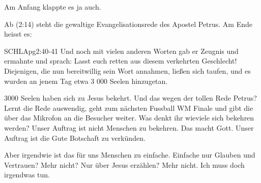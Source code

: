 \documentclass[14pt]{../../inc/mybib}
\newenvironment{block}[1][]{%
  \vspace{1.5em}%
  \noindent\textbf{#1}\par%
  \vspace{0.0em}%
}{%
  \vspace{1em}%
}
\begin{document}
    Am Anfang klappte es ja auch.
\begin{block}
    Ab (2:14) steht die gewaltige Evangelisationsrede des Apostel Petrus. Am Ende heisst es:
    \begin{bibelbox}{SCHL}{Apg}{2:40-41}
        Und noch mit vielen anderen Worten gab er Zeugnis und ermahnte und sprach: Lasst euch retten aus diesem verkehrten Geschlecht! Diejenigen, die nun bereitwillig sein Wort annahmen, ließen sich taufen, und es wurden an jenem Tag etwa 3 000 Seelen hinzugetan.
    \end{bibelbox} 
    3000 Seelen haben sich zu Jesus bekehrt. Und das wegen der tollen Rede Petrus? Lernt die Rede auswendig, geht zum nächsten Fussball WM Finale und gibt die über das Mikrofon an die Besucher weiter. Was denkt ihr wieviele sich bekehren werden? Unser Auftrag ist nicht Menschen zu bekehren. Das macht Gott. Unser Auftrag ist die Gute Botschaft zu verkünden.
\end{block}
\begin{block}
    Aber irgendwie ist das für uns Menschen zu einfache. Einfache nur Glauben und Vertrauen? Mehr nicht? Nur über Jesus erzählen? Mehr nicht. Ich muss doch irgendwas tun.
\end{block}
\end{document}
